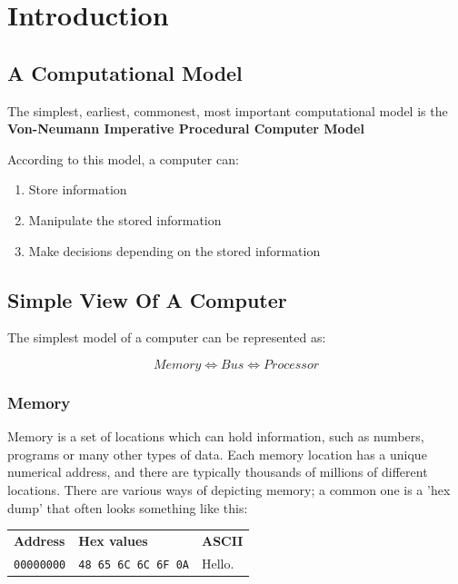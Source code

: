 
\section{Introduction}
\subsection{A Computational Model}

The simplest, earliest, commonest, most important computational model is the
\textbf{Von-Neumann Imperative Procedural Computer Model}

According to this model, a computer can:
\begin{enumerate}
	\item Store information
	\item Manipulate the stored information
	\item Make decisions depending on the stored information
\end{enumerate}

\subsection{Simple View Of A Computer}
The simplest model of a computer can be represented as:

\[
	Memory \Leftrightarrow Bus \Leftrightarrow Processor
\]

\subsubsection{Memory}

Memory is a set of locations which can hold information, such as numbers,
programs or many other types of data. Each memory location has a unique
numerical address, and there are typically thousands of millions of different
locations. There are various ways of depicting memory; a common one is a 'hex
dump' that often looks something like this:

\begin{center}
	\begin{tabular}{l l l}
		{\bf Address}     &	{\bf Hex values}	&	{\bf ASCII}\\
		{\tt 00000000}	&	{\tt 48 65 6C 6C 6F 0A}		&	Hello.\\
	\end{tabular}
\end{center}

